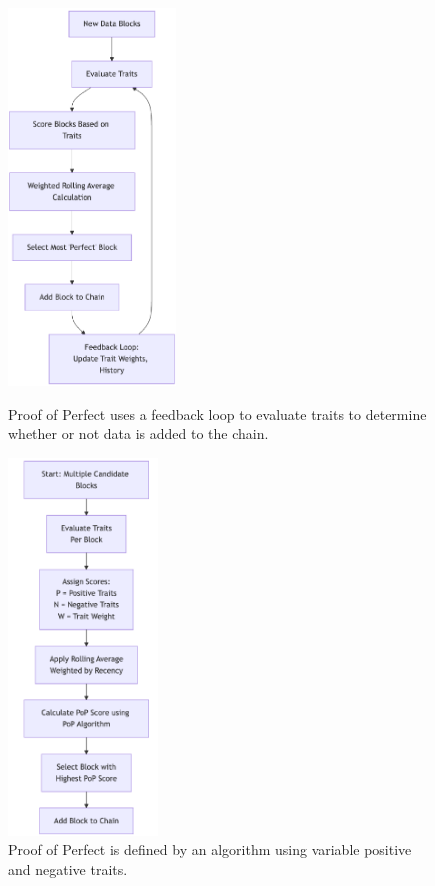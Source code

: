 \documentclass{article}
\begin{document}
\begin{figure}[h]
    \centering
    \begin{minipage}[t]{0.48\textwidth}
        \centering
        \vspace{0pt}
        \includegraphics[height=10cm]{proof-of-perfect-flow.png}
        \caption{Proof of Perfect uses a feedback loop to evaluate traits to determine whether or not data is added to the chain.}
    \end{minipage}
    \hfill
    \begin{minipage}[t]{0.48\textwidth}
        \centering
        \vspace{0pt}
        \includegraphics[height=10cm]{proof-of-perfect-algorithm.png}
        \caption{Proof of Perfect is defined by an algorithm using variable positive and negative traits.}
    \end{minipage}
\end{figure}
\end{document}
